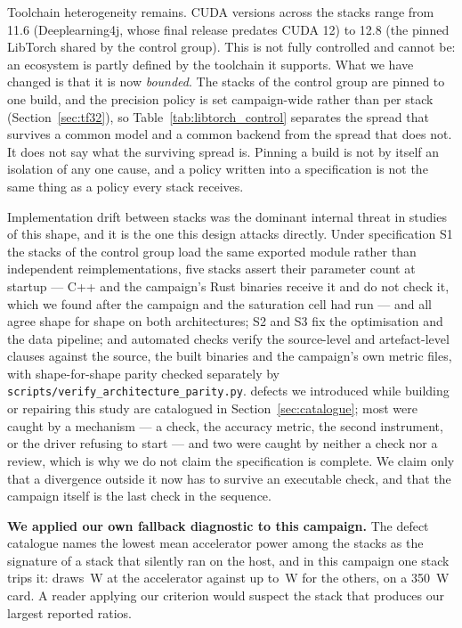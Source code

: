 Toolchain heterogeneity remains. CUDA versions across the \vEcosystems{} stacks
range from 11.6 (Deeplearning4j, whose final release predates CUDA 12) to 12.8
(the pinned LibTorch shared by the control group). This is not fully controlled and
cannot be: an ecosystem is partly defined by the toolchain it supports. What we
have changed is that it is now \emph{bounded}. The \vCtrlStacks{} stacks of the
control group are pinned to one build, and the precision policy is set
campaign-wide rather than per stack (Section~\ref{sec:tf32}), so
Table~\ref{tab:libtorch_control} separates the spread that survives a common
model and a common backend from the spread that does not. It does not say what
the surviving spread is. Pinning a build is not by itself an isolation of any
one cause, and a policy written into a specification is not the same thing as a
policy every stack receives.

Implementation drift between stacks was the dominant internal threat in studies
of this shape, and it is the one this design attacks directly. Under
specification S1 the \vCtrlStacks{} stacks of the control group load the same
exported module rather than independent reimplementations, five stacks assert
their parameter count at startup --- C++ and the campaign's Rust binaries
receive it and do not check it, which we found after the campaign and the saturation cell had run ---
and all \vEcosystems{} agree
shape for shape on both architectures; S2 and S3 fix the optimisation and the data
pipeline; and \vConformanceChecks{} automated checks verify the source-level
and artefact-level clauses against the source, the built binaries and the
campaign's own metric files, with shape-for-shape parity checked separately by
\texttt{scripts/verify\_architecture\_parity.py}.
\vDefectOurs{} defects we introduced while building or repairing this study
are catalogued in Section~\ref{sec:catalogue}; most were caught by a
mechanism --- a check, the accuracy metric, the second instrument, or the driver
refusing to start --- and two were caught by neither a check nor a review, which
is why we do not claim the specification is complete. We claim only that a
divergence outside it now has to survive an executable check, and that the
campaign itself is the last check in the sequence.

\textbf{We applied our own fallback diagnostic to this campaign.} The defect
catalogue names the lowest mean accelerator power among the stacks as the
signature of a stack that silently ran on the host, and in this campaign one
stack trips it: \vLowestGpuEco{} draws \vLowestGpuW\,\si{\watt} at the
accelerator against up to \vHighestGpuW\,\si{\watt} for the others, on a
\SI{350}{\watt} card. A reader applying our criterion would suspect the stack
that produces our largest reported ratios.

